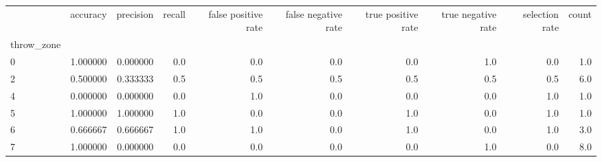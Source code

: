 \begin{tabular}{lrrrrrrrrr}
\toprule
{} &  accuracy &  precision &  recall &  false positive rate &  false negative rate &  true positive rate &  true negative rate &  selection rate &  count \\
throw\_zone &           &            &         &                      &                      &                     &                     &                 &        \\
\midrule
0          &  1.000000 &   0.000000 &     0.0 &                  0.0 &                  0.0 &                 0.0 &                 1.0 &             0.0 &    1.0 \\
2          &  0.500000 &   0.333333 &     0.5 &                  0.5 &                  0.5 &                 0.5 &                 0.5 &             0.5 &    6.0 \\
4          &  0.000000 &   0.000000 &     0.0 &                  1.0 &                  0.0 &                 0.0 &                 0.0 &             1.0 &    1.0 \\
5          &  1.000000 &   1.000000 &     1.0 &                  0.0 &                  0.0 &                 1.0 &                 0.0 &             1.0 &    1.0 \\
6          &  0.666667 &   0.666667 &     1.0 &                  1.0 &                  0.0 &                 1.0 &                 0.0 &             1.0 &    3.0 \\
7          &  1.000000 &   0.000000 &     0.0 &                  0.0 &                  0.0 &                 0.0 &                 1.0 &             0.0 &    8.0 \\
\bottomrule
\end{tabular}
